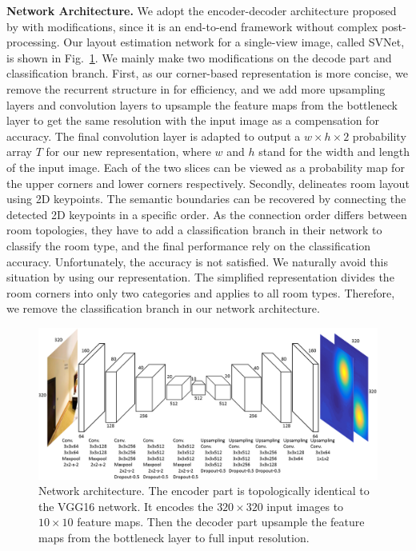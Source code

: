 \noindent\textbf{Network Architecture.}
We adopt the encoder-decoder architecture proposed by \cite{LeeRoomNet17} with modifications, since it is an end-to-end framework without complex post-processing. 
%
Our layout estimation network for a single-view image, called SVNet, is shown in Fig.~\ref{fig:network}. 
We mainly make two modifications on the decode part and classification branch. 
First, as our corner-based representation is more concise, we remove the recurrent structure in \cite{LeeRoomNet17} for efficiency, and we add more upsampling layers and convolution layers to upsample the feature maps from the bottleneck layer to get the same resolution with the input image as a compensation for accuracy. 
The final convolution layer is adapted to output a $w \times h \times 2$ probability array $T$ for our new representation, where $w$ and $h$ stand for the width and length of the input image. 
Each of the two slices can be viewed as a probability map for the upper corners and lower corners respectively. 
Secondly, \cite{LeeRoomNet17} delineates room layout using 2D keypoints. The semantic boundaries can be recovered by connecting the detected 2D keypoints in a specific order. As the connection order differs between room topologies, they have to add a classification branch in their network to classify the room type, and the final performance rely on the classification accuracy. 
Unfortunately, the accuracy is not satisfied. 
We naturally avoid this situation by using our representation. The simplified representation divides the room corners into only two categories and applies to all room types. 
Therefore, we remove the classification branch in our network architecture.
 
\begin{figure}
	\centering
	\includegraphics[width=\linewidth]{figs/network.png}
	\caption{Network architecture. The encoder part is topologically identical to the VGG16 network. It encodes the $320 \times 320$ input images to $10 \times 10$ feature maps. Then the decoder part upsample the feature maps from the bottleneck layer to full input resolution. }
	\label{fig:network}
\end{figure}

